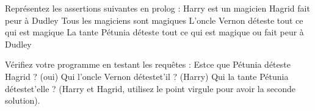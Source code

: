 \documentclass[a4paper]{article}
\newenvironment{CAnswer}{\color{red}\begin{Answer}}
                        {\end{Answer}}
\begin{document}
\begin{Exercise}[title={Premiers pas}]
\Question Représentez les assertions suivantes en prolog :
\subQuestion Harry est un magicien
\subQuestion Hagrid fait peur à Dudley
\subQuestion Tous les magiciens sont magiques
\subQuestion L'oncle Vernon déteste tout ce qui est magique
\subQuestion La tante Pétunia déteste tout ce qui est magique ou
             fait peur à Dudley

\Question Vérifiez votre programme en testant les requêtes :
\subQuestion Est­ce que Pétunia déteste Hagrid ? (oui)
\subQuestion Qui l'oncle Vernon déteste­t'il ? (Harry)
\subQuestion Qui la tante Pétunia déteste­t'elle ? (Harry et Hagrid,
             utilisez le point virgule pour avoir la seconde solution).
\end{Exercise}
\begin{CAnswer}

\end{CAnswer}
\end{document}
